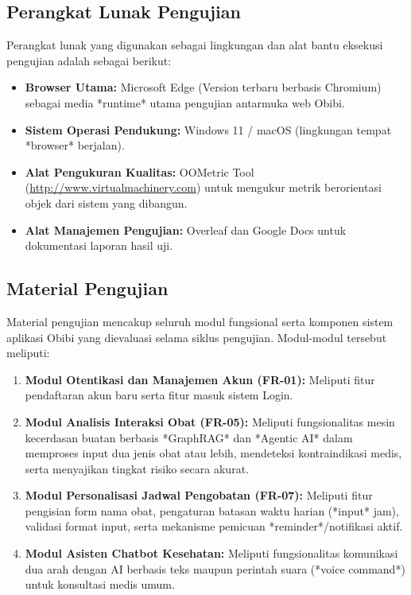 \documentclass[12pt, a4paper]{article}
\begin{document}
\subsection{Perangkat Lunak Pengujian}

Perangkat lunak yang digunakan sebagai lingkungan dan alat bantu eksekusi pengujian adalah sebagai berikut:
\begin{itemize}[leftmargin=2em]
  \item \textbf{Browser Utama:} Microsoft Edge (Version terbaru berbasis Chromium) sebagai media *runtime* utama pengujian antarmuka web Obibi.
  \item \textbf{Sistem Operasi Pendukung:} Windows 11 / macOS (lingkungan tempat *browser* berjalan).
  \item \textbf{Alat Pengukuran Kualitas:} OOMetric Tool (\url{http://www.virtualmachinery.com}) untuk mengukur metrik berorientasi objek dari sistem yang dibangun.
  \item \textbf{Alat Manajemen Pengujian:} Overleaf dan Google Docs untuk dokumentasi laporan hasil uji.
\end{itemize}

\subsection{Material Pengujian}

Material pengujian mencakup seluruh modul fungsional serta komponen sistem aplikasi Obibi yang dievaluasi selama siklus pengujian. Modul-modul tersebut meliputi:
\begin{enumerate}[leftmargin=2em]
  \item \textbf{Modul Otentikasi dan Manajemen Akun (FR-01):} Meliputi fitur pendaftaran akun baru serta fitur masuk sistem Login.
  \item \textbf{Modul Analisis Interaksi Obat (FR-05):} Meliputi fungsionalitas mesin kecerdasan buatan berbasis *GraphRAG* dan *Agentic AI* dalam memproses input dua jenis obat atau lebih, mendeteksi kontraindikasi medis, serta menyajikan tingkat risiko secara akurat.
  \item \textbf{Modul Personalisasi Jadwal Pengobatan (FR-07):} Meliputi fitur pengisian form nama obat, pengaturan batasan waktu harian (*input* jam), validasi format input, serta mekanisme pemicuan *reminder*/notifikasi aktif.
  \item \textbf{Modul Asisten Chatbot Kesehatan:} Meliputi fungsionalitas komunikasi dua arah dengan AI berbasis teks maupun perintah suara (*voice command*) untuk konsultasi medis umum.
\end{enumerate}
\end{document}

